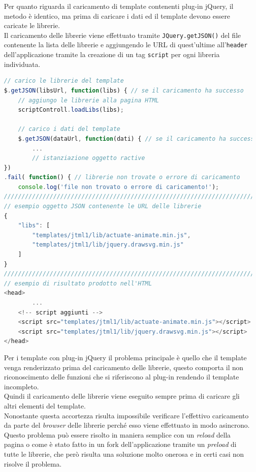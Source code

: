 Per quanto riguarda il caricamento di template contenenti plug-in jQuery, il metodo è identico, ma prima di caricare i dati ed il template devono essere caricate le librerie.\\
Il caricamento delle librerie viene effettuato tramite \texttt{JQuery.getJSON()} del file contenente la lista delle librerie e aggiungendo le URL di quest'ultime all'\texttt{header} dell'applicazione tramite la creazione di un tag \texttt{script} per ogni libreria individuata.\\
\begin{lstlisting}[language=JavaScript, caption=Codice per l'aggiunta delle librerie più esempio di JSON e risultato ottenuto.]
// carico le librerie del template
$.getJSON(libsUrl, function(libs) { // se il caricamento ha successo
	// aggiungo le librerie alla pagina HTML
	scriptControll.loadLibs(libs);

	// carico i dati del template
	$.getJSON(dataUrl, function(dati) { // se il caricamento ha successo
		...
		// istanziazione oggetto ractive
})
.fail( function() { // librerie non trovate o errore di caricamento
	console.log('file non trovato o errore di caricamento!');
///////////////////////////////////////////////////////////////////////
// esempio oggetto JSON contenente le URL delle librerie
{
	"libs": [
		"templates/jtml1/lib/actuate-animate.min.js",
		"templates/jtml1/lib/jquery.drawsvg.min.js"
	]
}
///////////////////////////////////////////////////////////////////////
// esempio di risultato prodotto nell'HTML
<head>
		...
	<!-- script aggiunti -->
	<script src="templates/jtml1/lib/actuate-animate.min.js"></script>
	<script src="templates/jtml1/lib/jquery.drawsvg.min.js"></script>
</head>

\end{lstlisting}
Per i template con plug-in jQuery il problema principale è quello che il template venga renderizzato prima del caricamento delle librerie, questo comporta il non riconoscimento delle funzioni che si riferiscono al plug-in rendendo il template incompleto.\\
Quindi il caricamento delle librerie viene eseguito sempre prima di caricare gli altri elementi del template.\\
Nonostante questa accortezza risulta impossibile verificare l'effettivo caricamento da parte del \textit{browser} delle librerie perché esso viene effettuato in modo asincrono.\\
Questo problema può essere risolto in maniera semplice con un \textit{reload} della pagina o come è stato fatto in un fork dell'applicazione tramite un \textit{preload} di tutte le librerie, che però risulta una soluzione molto onerosa e in certi casi non risolve il problema.

